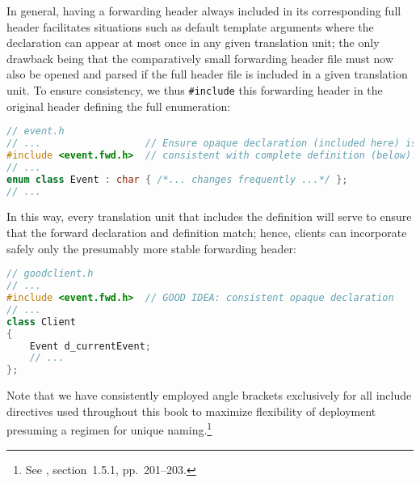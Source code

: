 In general, having a forwarding header always included in its
corresponding full header facilitates situations such as default
template arguments where the declaration can appear at most once in any
given translation unit; the only drawback being that the
comparatively small forwarding header file must now also be opened and
parsed if the full header file is included in a given translation
unit. To ensure consistency, we thus \lstinline!#include! this forwarding
header in the original header defining the full enumeration:

\begin{lstlisting}[language=C++]
// event.h
// ...                  // Ensure opaque declaration (included here) is
#include <event.fwd.h>  // consistent with complete definition (below).
// ...
enum class Event : char { /*... changes frequently ...*/ };
// ...
\end{lstlisting}

\noindent In this way, every translation unit that includes the definition will
serve to ensure that the forward declaration and definition match;
hence, clients can incorporate safely only the presumably more stable
forwarding header:

\begin{lstlisting}[language=C++]
// goodclient.h
// ...
#include <event.fwd.h>  // GOOD IDEA: consistent opaque declaration
// ...
class Client
{
    Event d_currentEvent;
    // ...
};
\end{lstlisting}

\noindent Note that we have consistently
employed angle brackets exclusively for all include directives used
throughout this book to maximize flexibility of deployment presuming a
  regimen for unique naming.\footnote{See \cite{lakos20}, section~1.5.1,
  pp.~201--203.}

